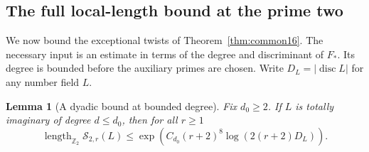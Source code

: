 \documentclass[a4paper,11pt]{article}
\newtheorem{lemma}[proposition]{Lemma}
\theoremstyle{definition}
\theoremstyle{remark}
\newcommand{\ZZ}{\mathbb Z}\newcommand{\ord}{\operatorname{ord}}
\newcommand{\len}{\operatorname{length}}\newcommand{\Res}{\operatorname*{Res}}
\numberwithin{equation}{section}
\begin{document}
\subsection{The full local-length bound at the prime two}\label{nav:II-12}
\label{sec:dyadic17}

We now bound the exceptional twists of Theorem~\ref{thm:common16}. The necessary input is an estimate in terms of the degree and discriminant of \(F_*\). Its degree is bounded before the auxiliary primes are chosen. Write \(D_L=|\operatorname{disc}L|\) for any number field \(L\).

\begin{lemma}[A dyadic bound at bounded degree]\label{lem:coarse17}
Fix \(d_0\ge2\). If \(L\) is totally imaginary of degree \(d\le d_0\), then for all \(r\ge1\)
\[
 \len_{\ZZ_2}\mathcal S_{2,r}(L)
       \le \exp\!\left(C_{d_0}(r+2)^8\log(2(r+2)D_L)\right).
\]
\end{lemma}
\end{document}
